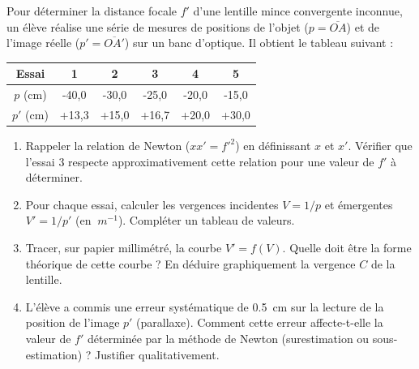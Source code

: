 \documentclass[11pt]{article}
\begin{document}
\begin{exercice}
Pour déterminer la distance focale $f'$ d'une lentille mince convergente inconnue, un élève réalise une série de mesures de positions de l'objet ($p = \overline{OA}$) et de l'image réelle ($p' = \overline{OA'}$) sur un banc d'optique. Il obtient le tableau suivant :
\begin{center}
\begin{tabular}{|c|c|c|c|c|c|}
\hline
Essai & 1 & 2 & 3 & 4 & 5 \\
\hline
$p$ (cm) & -40,0 & -30,0 & -25,0 & -20,0 & -15,0 \\
\hline
$p'$ (cm) & +13,3 & +15,0 & +16,7 & +20,0 & +30,0 \\
\hline
\end{tabular}
\end{center}
\begin{enumerate}
    \item Rappeler la relation de Newton ($x x' = f'^2$) en définissant $x$ et $x'$. Vérifier que l'essai 3 respecte approximativement cette relation pour une valeur de $f'$ à déterminer.
    \item Pour chaque essai, calculer les vergences incidentes $V = 1/p$ et émergentes $V' = 1/p'$ (en $\SI{}{m^{-1}}$). Compléter un tableau de valeurs.
    \item Tracer, sur papier millimétré, la courbe $V' = f(V)$. Quelle doit être la forme théorique de cette courbe ? En déduire graphiquement la vergence $C$ de la lentille.
    \item L'élève a commis une erreur systématique de \SI{+0,5}{cm} sur la lecture de la position de l'image $p'$ (parallaxe). Comment cette erreur affecte-t-elle la valeur de $f'$ déterminée par la méthode de Newton (surestimation ou sous-estimation) ? Justifier qualitativement.
\end{enumerate}
\end{exercice}
\end{document}
